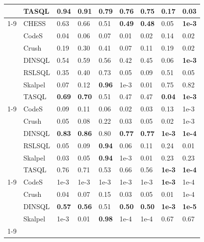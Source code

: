 \begin{table}
\begin{tabular}{lllllllll}
 & TASQL & \textbf{0.94} & \textbf{0.91} & 0.79 & \textbf{0.76} & \textbf{0.75} & \textbf{0.17} & \textbf{0.03} \\
\cline{1-9}
\multirow[t]{7}{*}{L} & CHESS & 0.63 & 0.66 & 0.51 & \textbf{0.49} & \textbf{0.48} & 0.05 & \textbf{1e-3} \\
 & CodeS & 0.04 & 0.06 & 0.07 & 0.01 & 0.02 & 0.14 & 0.02 \\
 & Crush & 0.19 & 0.30 & 0.41 & 0.07 & 0.11 & 0.19 & 0.02 \\
 & DINSQL & 0.54 & 0.59 & 0.56 & 0.42 & 0.45 & 0.06 & \textbf{1e-3} \\
 & RSLSQL & 0.35 & 0.40 & 0.73 & 0.05 & 0.09 & 0.51 & 0.05 \\
 & Skalpel & 0.07 & 0.12 & \textbf{0.96} & 1e-3 & 0.01 & 0.75 & 0.82 \\
 & TASQL & \textbf{0.69} & \textbf{0.70} & 0.51 & 0.47 & 0.47 & \textbf{0.04} & \textbf{1e-3} \\
\cline{1-9}
\multirow[t]{6}{*}{XL} & CodeS & 0.09 & 0.11 & 0.06 & 0.02 & 0.03 & 0.13 & 1e-3 \\
 & Crush & 0.05 & 0.08 & 0.22 & 0.03 & 0.05 & 0.02 & 1e-3 \\
 & DINSQL & \textbf{0.83} & \textbf{0.86} & 0.80 & \textbf{0.77} & \textbf{0.77} & \textbf{1e-3} & \textbf{1e-4} \\
 & RSLSQL & 0.05 & 0.09 & \textbf{0.94} & 0.06 & 0.11 & 0.24 & 0.01 \\
 & Skalpel & 0.03 & 0.05 & \textbf{0.94} & 1e-3 & 0.01 & 0.23 & 0.23 \\
 & TASQL & 0.76 & 0.71 & 0.53 & 0.66 & 0.56 & \textbf{1e-3} & \textbf{1e-4} \\
\cline{1-9}
\multirow[t]{4}{*}{XXL} & CodeS & 1e-3 & 1e-3 & 1e-3 & 1e-3 & 1e-3 & \textbf{1e-3} & 1e-4 \\
 & Crush & 0.04 & 0.07 & 0.15 & 0.03 & 0.05 & 0.01 & 1e-4 \\
 & DINSQL & \textbf{0.57} & \textbf{0.56} & 0.51 & \textbf{0.50} & \textbf{0.50} & \textbf{1e-3} & \textbf{1e-5} \\
 & Skalpel & 1e-3 & 0.01 & \textbf{0.98} & 1e-4 & 1e-4 & 0.67 & 0.67 \\
\cline{1-9}
\bottomrule
\end{tabular}
\end{table}

